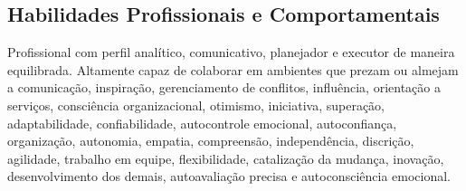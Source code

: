 \documentclass[a4paper,10pt]{article}
\begin{document}
\begin{itemize}
\section*{Habilidades Profissionais e Comportamentais}
\vspace{0.6em}

Profissional com perfil analítico, comunicativo, planejador e executor de maneira equilibrada. Altamente capaz de colaborar em  ambientes que prezam ou almejam a  comunicação, inspiração, gerenciamento de conflitos, influência, orientação a serviços, consciência organizacional, otimismo, iniciativa, superação, adaptabilidade, confiabilidade, autocontrole emocional, autoconfiança, organização, autonomia, empatia, compreensão, independência, discrição, agilidade, trabalho em equipe, flexibilidade, catalização da mudança, inovação,  desenvolvimento dos demais, autoavaliação precisa e autoconsciência emocional. 

\end{itemize}
\end{document}
